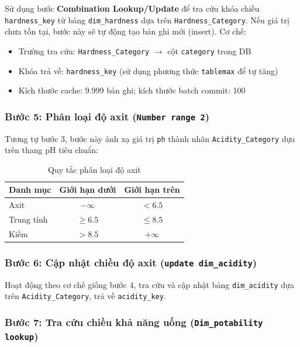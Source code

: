 Sử dụng bước \textbf{Combination Lookup/Update} để tra cứu khóa chiều \texttt{hardness\_key} từ bảng \texttt{dim\_hardness} dựa trên \texttt{Hardness\_Category}. Nếu giá trị chưa tồn tại, bước này sẽ tự động tạo bản ghi mới (insert). Cơ chế:
\begin{itemize}
    \item Trường tra cứu: \texttt{Hardness\_Category} $\rightarrow$ cột \texttt{category} trong DB
    \item Khóa trả về: \texttt{hardness\_key} (sử dụng phương thức \texttt{tablemax} để tự tăng)
    \item Kích thước cache: 9.999 bản ghi; kích thước batch commit: 100
\end{itemize}

\subsubsection{Bước 5: Phân loại độ axit (\texttt{Number range 2})}

Tương tự bước 3, bước này ánh xạ giá trị \texttt{ph} thành nhãn \texttt{Acidity\_Category} dựa trên thang pH tiêu chuẩn:

\begin{table}[H]
\centering
\caption{Quy tắc phân loại độ axit}
\label{tab:acidity_range}
\begin{tabular}{lcc}
\hline
\textbf{Danh mục} & \textbf{Giới hạn dưới} & \textbf{Giới hạn trên} \\
\hline
Axit & $-\infty$ & $< 6.5$ \\
Trung tính & $\geq 6.5$ & $\leq 8.5$ \\
Kiềm & $> 8.5$ & $+\infty$ \\
\hline
\end{tabular}
\end{table}

\subsubsection{Bước 6: Cập nhật chiều độ axit (\texttt{update dim\_acidity})}

Hoạt động theo cơ chế giống bước 4, tra cứu và cập nhật bảng \texttt{dim\_acidity} dựa trên \texttt{Acidity\_Category}, trả về \texttt{acidity\_key}.

\subsubsection{Bước 7: Tra cứu chiều khả năng uống (\texttt{Dim\_potability lookup})}

